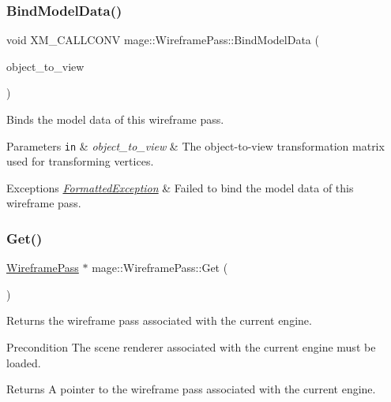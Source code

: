 \subsubsection{\texorpdfstring{Bind\+Model\+Data()}{BindModelData()}}
{\footnotesize\ttfamily void X\+M\+\_\+\+C\+A\+L\+L\+C\+O\+NV mage\+::\+Wireframe\+Pass\+::\+Bind\+Model\+Data (\begin{DoxyParamCaption}\item[{F\+X\+M\+M\+A\+T\+R\+IX}]{object\+\_\+to\+\_\+view }\end{DoxyParamCaption})\hspace{0.3cm}{\ttfamily [private]}}

Binds the model data of this wireframe pass.


\begin{DoxyParams}[1]{Parameters}
\mbox{\tt in}  & {\em object\+\_\+to\+\_\+view} & The object-\/to-\/view transformation matrix used for transforming vertices. \\
\hline
\end{DoxyParams}

\begin{DoxyExceptions}{Exceptions}
{\em \hyperlink{classmage_1_1_formatted_exception}{Formatted\+Exception}} & Failed to bind the model data of this wireframe pass. \\
\hline
\end{DoxyExceptions}
\hypertarget{classmage_1_1_wireframe_pass_ace5168eac9d32c1bfa71df3411960f48}{}\label{classmage_1_1_wireframe_pass_ace5168eac9d32c1bfa71df3411960f48} 
\subsubsection{\texorpdfstring{Get()}{Get()}}
{\footnotesize\ttfamily \hyperlink{classmage_1_1_wireframe_pass}{Wireframe\+Pass} $\ast$ mage\+::\+Wireframe\+Pass\+::\+Get (\begin{DoxyParamCaption}{ }\end{DoxyParamCaption})\hspace{0.3cm}{\ttfamily [static]}}

Returns the wireframe pass associated with the current engine.

\begin{DoxyPrecond}{Precondition}
The scene renderer associated with the current engine must be loaded. 
\end{DoxyPrecond}
\begin{DoxyReturn}{Returns}
A pointer to the wireframe pass associated with the current engine. 
\end{DoxyReturn}
\hypertarget{classmage_1_1_wireframe_pass_a57da0b468c68c8653ebc639923b111ba}{}\label{classmage_1_1_wireframe_pass_a57da0b468c68c8653ebc639923b111ba} 
